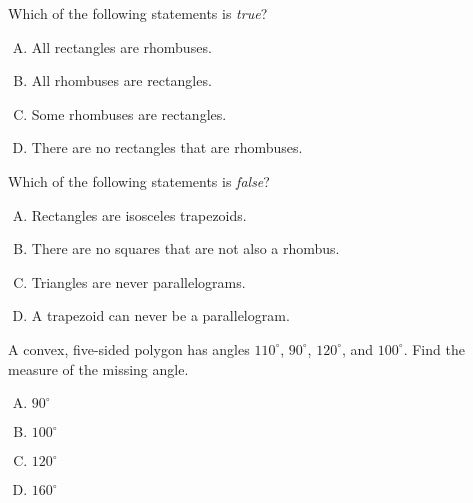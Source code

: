 \documentclass[12pt,letterpaper]{exam}
\begin{document}
\begin{questions}
\vfill



\question Which of the following statements is \textit{true}?
        \begin{enumerate}[A.]
        \item All rectangles are rhombuses.
        \item All rhombuses are rectangles.
        \item Some rhombuses are rectangles.
        \item There are no rectangles that are rhombuses. %
        \end{enumerate}



\vfill



\question Which of the following statements is \textit{false}?
        \begin{enumerate}[A.]
        \item Rectangles are isosceles trapezoids. 
        \item There are no squares that are not also a rhombus. 
        \item Triangles are never parallelograms. %
        \item A trapezoid can never be a parallelogram. 
        \end{enumerate}



\newpage



\question A convex, five-sided polygon has angles $110^\circ$, $90^\circ$, $120^\circ$, and $100^\circ$. Find the measure of the missing angle. 

        \begin{enumerate}[A.]
        \item $90^\circ$ %
        \item $100^\circ$
        \item $120^\circ$
        \item $160^\circ$
        \end{enumerate}




\end{questions}
\end{document}
